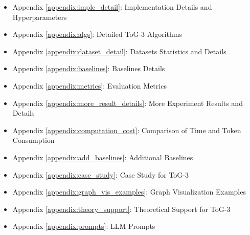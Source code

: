 \documentclass[11pt]{article}
\begin{document}
\begin{itemize}
    \item Appendix \ref{appendix:imple_detail}: Implementation Details and Hyperparameters
    \item Appendix \ref{appendix:algs}: Detailed ToG-3 Algorithms
    \item Appendix \ref{appendix:dataset_detail}: Datasets Statistics and Details 
    \item Appendix \ref{appendix:baselines}: Baselines Details
    \item Appendix \ref{appendix:metrics}: Evaluation Metrics
    \item Appendix \ref{appendix:more_result_details}: More Experiment Results and Details
    \item Appendix \ref{appendix:computation_cost}: Comparison of Time and Token Consumption
    \item Appendix \ref{appendix:add_baselines}: Additional Baselines
    \item Appendix \ref{appendix:case_study}: Case Study for ToG-3
    \item Appendix \ref{appendix:graph_vis_examples}: Graph Visualization Examples
    \item Appendix \ref{appendix:theory_support}: Theoretical Support for ToG-3
    \item Appendix \ref{appendix:prompts}: LLM Prompts
\end{itemize}

% 












% 
\end{document}
